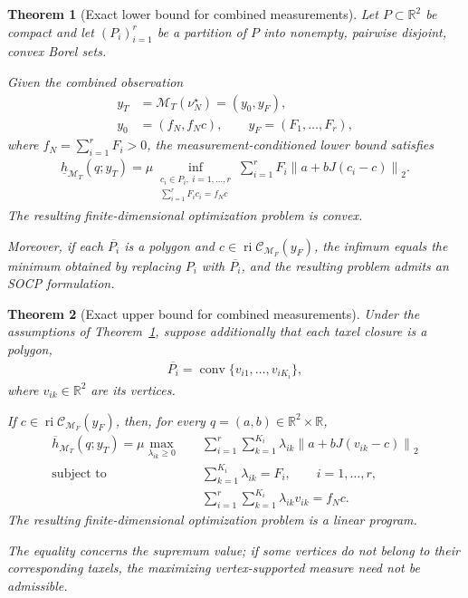 \documentclass[11pt,a4paper]{article}
\theoremstyle{proposition}
\newtheorem{theorem}{Theorem}[section]
\begin{document}
\begin{theorem}[Exact lower bound for combined measurements]
\label{thm:combined_lower}
    Let $P\subset\mathbb R^2$ be compact and let
    $(P_i)_{i=1}^r$ be a partition of $P$ into nonempty,
    pairwise disjoint, convex Borel sets.

    Given the combined observation
    \begin{align}
        y_T
        &=
        \mathcal M_T(\nu_N^\star)
        =(y_0,y_F),\\
        y_0&=(f_N,f_Nc),
        \qquad
        y_F=(F_1,\ldots,F_r),
    \end{align}
    where $f_N=\sum_{i=1}^rF_i>0$, the measurement-conditioned
    lower bound satisfies
    \begin{align}
        \label{eq:combined_lower_reduction}
        \underline h_{\mathcal M_T}(q;y_T)
        =
        \mu
        \inf_{\substack{
            c_i\in P_i,\ i=1,\ldots,r\\
            \sum_{i=1}^rF_ic_i=f_Nc
        }}
        \sum_{i=1}^r
        F_i\left\|a+bJ(c_i-c)\right\|_2.
    \end{align}
    The resulting finite-dimensional optimization problem is convex.

    Moreover, if each $\overline{P_i}$ is a polygon and
    $c\in\operatorname{ri}\mathcal C_{\mathcal M_F}(y_F)$,
    the infimum equals the minimum obtained by replacing
    $P_i$ with $\overline{P_i}$, and the resulting problem
    admits an SOCP formulation.
\end{theorem}


\begin{theorem}[Exact upper bound for combined measurements]
\label{thm:combined_upper}
    Under the assumptions of Theorem~\ref{thm:combined_lower},
    suppose additionally that each taxel closure is a polygon,
    \begin{align}
        \overline{P_i}
        =
        \operatorname{conv}
        \{v_{i1},\ldots,v_{iK_i}\},
    \end{align}
    where $v_{ik}\in\mathbb R^2$ are its vertices.

    If $c\in\operatorname{ri}\mathcal C_{\mathcal M_F}(y_F)$,
    then, for every $q=(a,b)\in\mathbb R^2\times\mathbb R$,
    \begin{align}
        \label{eq:combined_upper_reduction}
        \overline h_{\mathcal M_T}(q;y_T)
        =
        \mu\max_{\lambda_{ik}\geq0}\quad&
        \sum_{i=1}^r\sum_{k=1}^{K_i}
        \lambda_{ik}
        \left\|a+bJ(v_{ik}-c)\right\|_2\\
        \text{subject to}\quad&
        \sum_{k=1}^{K_i}\lambda_{ik}=F_i,
        \qquad i=1,\ldots,r,\\
        &
        \sum_{i=1}^r\sum_{k=1}^{K_i}
        \lambda_{ik}v_{ik}=f_Nc.
    \end{align}
    The resulting finite-dimensional optimization problem
    is a linear program.

    The equality concerns the supremum value; if some
    vertices do not belong to their corresponding taxels,
    the maximizing vertex-supported measure need not be
    admissible.
\end{theorem}
\end{document}
